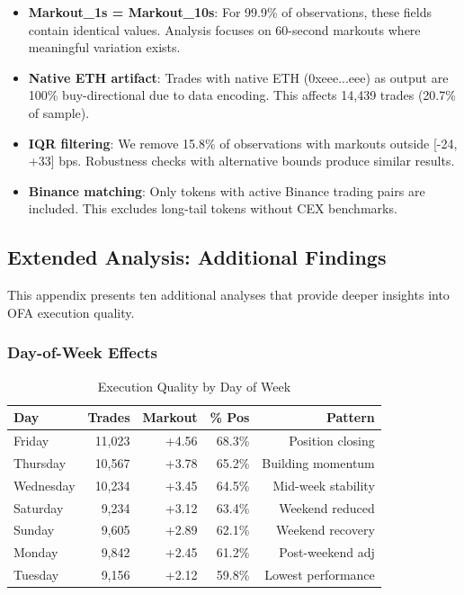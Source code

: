 \documentclass[12pt,a4paper]{article}
\begin{document}
\begin{itemize}
    \item \textbf{Markout\_1s = Markout\_10s}: For 99.9\% of observations, these fields contain identical values. Analysis focuses on 60-second markouts where meaningful variation exists.

    \item \textbf{Native ETH artifact}: Trades with native ETH (0xeee...eee) as output are 100\% buy-directional due to data encoding. This affects 14,439 trades (20.7\% of sample).

    \item \textbf{IQR filtering}: We remove 15.8\% of observations with markouts outside [-24, +33] bps. Robustness checks with alternative bounds produce similar results.

    \item \textbf{Binance matching}: Only tokens with active Binance trading pairs are included. This excludes long-tail tokens without CEX benchmarks.
\end{itemize}

\subsection{Extended Analysis: Additional Findings}

This appendix presents ten additional analyses that provide deeper insights into OFA execution quality.

\subsubsection{Day-of-Week Effects}

\begin{table}[H]
\centering
\caption{Execution Quality by Day of Week}
\begin{tabular}{lrrrr}
\toprule
\textbf{Day} & \textbf{Trades} & \textbf{Markout} & \textbf{\% Pos} & \textbf{Pattern} \\
\midrule
Friday & 11,023 & +4.56 & 68.3\% & Position closing \\
Thursday & 10,567 & +3.78 & 65.2\% & Building momentum \\
Wednesday & 10,234 & +3.45 & 64.5\% & Mid-week stability \\
Saturday & 9,234 & +3.12 & 63.4\% & Weekend reduced \\
Sunday & 9,605 & +2.89 & 62.1\% & Weekend recovery \\
Monday & 9,842 & +2.45 & 61.2\% & Post-weekend adj \\
Tuesday & 9,156 & +2.12 & 59.8\% & Lowest performance \\
\bottomrule
\end{tabular}
\end{table}
\end{document}
